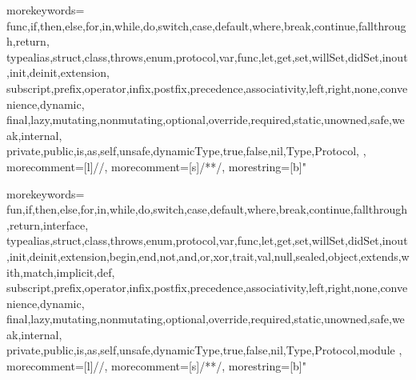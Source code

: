 \newcommand*\circled[1]{\tikz[baseline=(char.base)]{
            \node[shape=circle,draw,inner sep=0pt] (char) {#1};}}

\usepackage{tikz}

\newcommand{\smiley}{\tikz[baseline=-0.75ex,black]{
    \draw circle (2mm);
\node[fill,circle,inner sep=0.5pt] (left eye) at (135:0.8mm) {};
\node[fill,circle,inner sep=0.5pt] (right eye) at (45:0.8mm) {};
\draw (-145:0.9mm) arc (-120:-60:1.5mm);
    }
}

\newcommand{\frownie}{\tikz[baseline=-0.75ex,black]{
    \draw circle (2mm);
\node[fill,circle,inner sep=0.5pt] (left eye) at (135:0.8mm) {};
\node[fill,circle,inner sep=0.5pt] (right eye) at (45:0.8mm) {};
\draw (-145:0.9mm) arc (120:60:1.5mm);
    }
}

\newcommand{\neutranie}{\tikz[baseline=-0.75ex,black]{
    \draw circle (2mm);
\node[fill,circle,inner sep=0.5pt] (left eye) at (135:0.8mm) {};
\node[fill,circle,inner sep=0.5pt] (right eye) at (45:0.8mm) {};
\draw (-135:0.9mm) -- (-45:0.9mm);
    }
}

{
  morekeywords={
    func,if,then,else,for,in,while,do,switch,case,default,where,break,continue,fallthrough,return,
    typealias,struct,class,throws,enum,protocol,var,func,let,get,set,willSet,didSet,inout,init,deinit,extension,
    subscript,prefix,operator,infix,postfix,precedence,associativity,left,right,none,convenience,dynamic,
    final,lazy,mutating,nonmutating,optional,override,required,static,unowned,safe,weak,internal,
    private,public,is,as,self,unsafe,dynamicType,true,false,nil,Type,Protocol,
  },
  morecomment=[l]{//}, %
  morecomment=[s]{/*}{*/}, %
  morestring=[b]" %
}

{
  morekeywords={
    fun,if,then,else,for,in,while,do,switch,case,default,where,break,continue,fallthrough,return,interface,
    typealias,struct,class,throws,enum,protocol,var,func,let,get,set,willSet,didSet,inout,init,deinit,extension,begin,end,not,and,or,xor,trait,val,null,sealed,object,extends,with,match,implicit,def,
    subscript,prefix,operator,infix,postfix,precedence,associativity,left,right,none,convenience,dynamic,
    final,lazy,mutating,nonmutating,optional,override,required,static,unowned,safe,weak,internal,
    private,public,is,as,self,unsafe,dynamicType,true,false,nil,Type,Protocol,module
  },
  morecomment=[l]{//}, %
  morecomment=[s]{/*}{*/}, %
  morestring=[b]" %
}

